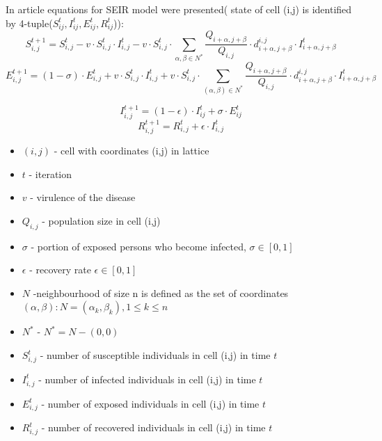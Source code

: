 \documentclass[a4paper, 11pt]{article}
\begin{document}
	
	
	
	In article \cite{cisse} equations for SEIR model were presented( state of cell (i,j) is identified by 4-tuple($S^t_{ij},I^t_{ij},E^t_{ij},R^t_{ij} $)): 
			\begin{equation}
	S^{t+1}_{i,j}=S^{t}_{i,j}-v\cdot S^{t}_{i,j}\cdot I^t_{i,j} -v\cdot S^{t}_{i,j}\cdot  \sum\limits_{\alpha,\beta\in N^{*}}\frac{Q_{i+\alpha,j+\beta}}{Q_{i,j}}\cdot d^{i,j}_{i+\alpha,j+\beta}\cdot I^{t}_{i+\alpha,j+\beta} 
\end{equation}	
	\begin{equation}
	E^{t+1}_{i,j}=(1-\sigma)\cdot E^t_{i,j}+v\cdot S^{t}_{i,j}\cdot I^t_{i,j} +v\cdot S^{t}_{i,j}\cdot  \sum\limits_{\left(\alpha,\beta\right)\in N^{*}}\frac{Q_{i+\alpha,j+\beta}}{Q_{i,j}}\cdot d^{i,j}_{i+\alpha,j+\beta}\cdot I^{t}_{i+\alpha,j+\beta}
	\end{equation}		

\begin{equation}
I^{t+1}_{i,j}=\left(1-\epsilon\right)\cdot I^{t}_{ij}+\sigma\cdot E^t_{ij}
\end{equation}
	\begin{equation}
	R^{t+1}_{i,j}=R^{t}_{i,j}+\epsilon\cdot I^{t}_{i,j}
\end{equation}	
	\begin{itemize}
	\item $(i,j)$ - cell with coordinates (i,j) in lattice
	\item $t$ - iteration
	\item $v$ - virulence of the disease
	\item $Q_{i,j}$ - population size in cell (i,j)
	\item $\sigma$ - portion of exposed persons who become infected, $\sigma \in \left[0,1\right]$
	\item $\epsilon$ - recovery rate $\epsilon \in \left[0,1\right]$
	\item $N$ -neighbourhood of size n is defined as the set of coordinates $(\alpha,\beta): N={(\alpha_k,\beta_k),1\leq k \leq n}$
	\item $N^{*}$ - $ N^{*}= N-{(0,0)} $ 
	\item $S^{t}_{i,j}$ - number of susceptible individuals in cell (i,j) in time $t$
	\item $I^{t}_{i,j}$ - number of infected individuals in cell (i,j) in time $t$
	\item $E^{t}_{i,j}$ - number of exposed individuals in cell (i,j) in time $t$
	\item $R^{t}_{i,j}$ - number of recovered individuals in cell (i,j) in time $t$
	\end{itemize}
\end{document}
